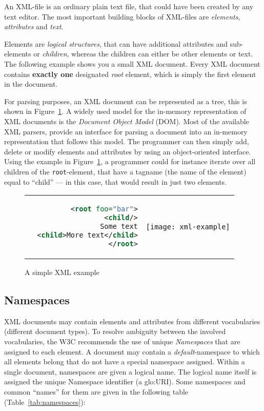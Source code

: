 An XML-file is  an ordinary plain text file, that  could have been created
by any text  editor.  The most important building  blocks of XML-files are
\emph{elements}, \emph{attributes} and \emph{text}.

Elements   are  \emph{logical  structures},   that  can   have  additional
attributes and  sub-elements or \emph{children}, whereas  the children can
either be other elements or text.  The following example shows you a small
XML document. Every XML  document contains \textbf{exactly one} designated
\emph{root} element, which is simply the first element in the document.

For parsing purposes,  an XML document can be represented  as a tree, this
is  shown in Figure~\ref{fig:xml-example}.   A widely  used model  for the
in-memory  representation of  XML documents  is the  \emph{Document Object
  Model} (DOM).  Most  of the available XML parsers,  provide an interface
for parsing a document into  an in-memory representation that follows this
model. The programmer  can then simply add, delete  or modify elements and
attributes by  using an object-oriented  interface.  Using the  example in
Figure~\ref{fig:xml-example}, a programmer could for instance iterate over
all children  of the \texttt{root}-element, that have  a tagname (\ie the
name  of the  element) equal  to ``child''  --- in  this case,  that would
result in just two elements.

\begin{figure}[h]
  \centering
  \begin{tabular}{rc}
    \begin{minipage}[c]{.35\textwidth}
      \begin{lstlisting}[language=XML]
<root foo="bar">
  <child/>
  Some text
  <child>More text</child>
</root>
      \end{lstlisting}%
    \end{minipage} &
    \begin{minipage}[c]{.35\textwidth}
      \texttt{[image: xml-example]}
    \end{minipage}
  \end{tabular}
  \caption{A simple XML example}
  \label{fig:xml-example}
\end{figure}

\subsection{Namespaces}

XML  documents   may  contain  elements  and   attributes  from  different
vocabularies (\ie different document  types). To resolve ambiguity between
the  involved   vocabularies,  the  W3C  recommends  the   use  of  unique
\emph{Namespaces}  that are  assigned  to each  element.   A document  may
contain a  \emph{default}-namespace to which  all elements belong  that do
not  have  a  special  namespace  assigned.   Within  a  single  document,
namespaces are given  a logical name. The logical  name itself is assigned
the unique Namespace identifier (\eg a \gls{glo:URI}). Some namespaces and
common   ``names''   for  them   are   given   in   the  following   table
(Table~\ref{tab:namespaces}):


